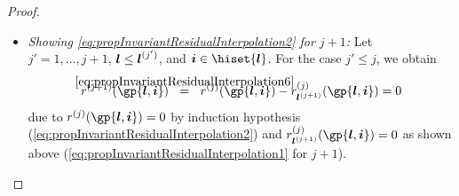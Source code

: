 \begin{proof}
\begin{itemize}
    As in the proof of \cref{lemma:combiTechniqueIdenticalValues},
    we exploit the tensor product nature of the basis functions and
    restrict $r_{\*l^{(j+1)}}^{(j)}$ to $S \cap \clint{0, 1}$:
    \begin{subequations}
      \begin{align}
        (\restrictfcn{r_{\*l^{(j+1)}}^{(j)}}{S \cap \clint{0, 1}})(x_{t'})
        &\mathrel{\righthphantom{=}{\ceq}}
        \sum_{l'_{t'}=0}^{l_{t'}^{(j+1)}}
        \sum_{i'_{t'} \in \hiset{l'_{t'}}}
        \surplustilde[(j+1)]{l'_{t'},i'_{t'}}
        \basis{l'_{t'},i'_{t'}}(x_{t'}),\quad
        x_{t'} \in \clint{0, 1},\\
        \surplustilde[(j+1)]{l'_{t'},i'_{t'}}
        &\ceq \sum_{\*l'_{-t'}=\*0}^{\*l^{(j+1)}_{-t'}}
        \sum_{\*i'_{-t'} \in \hiset{\*l'_{-t'}}}
        \surplus[(j+1)]{\*l',\*i'}
        \basis{\*l'_{-t'},\*i'_{-t'}}(\gp{\*l_{-t'},\*i_{-t'}}),
      \end{align}
    \end{subequations}
    where the subscript $-t'$ indicates all entries but the $t'$-th.
    As a consequence, this shows that
    $\restrictfcn{r_{\*l^{(j+1)}}^{(j)}}{S \cap \clint{0, 1}} \in
    \ns{l_{t'}^{(j+1)}}$ is an interpolant of the zero function
    (by \eqref{eq:proofPropInvariantResidualInterpolation2}).
    Due to the linear independence of the univariate basis functions,
    we conclude
    \begin{equation}
      \restrictfcn{r_{\*l^{(j+1)}}^{(j)}}{S \cap \clint{0, 1}}
      \equiv 0.
    \end{equation}
    Consequently, we obtain
    $r_{\*l^{(j+1)}}^{(j)}(\gp{\*l,\*i}) = 0$
    as $\gp{\*l,\*i} \in S \cap \clint{\*0, \*1}$.
    
    \item
    \emph{Showing \eqref{eq:propInvariantResidualInterpolation2} for $j + 1$:}
    Let $j' = 1, \dotsc, j + 1$, ${\boldsymbol{l}} \le {\boldsymbol{l}}^{(j')}$,
    and $\*i \in \hiset{\*l}$.
    For the case $j' \le j$, we obtain
    \begin{equation}
      \label{eq:proofPropInvariantResidualInterpolation1}
      r^{(j+1)}(\gp{\*l,\*i})
      \eqwithref{6}
      r^{(j)}(\gp{\*l,\*i}) - r_{\*l^{(j+1)}}^{(j)}(\gp{\*l,\*i})
      = 0
    \end{equation}
    due to $r^{(j)}(\gp{\*l,\*i}) = 0$ by induction hypothesis
    (\cref{eq:propInvariantResidualInterpolation2}) and
    $r_{\*l^{(j+1)}}^{(j)}(\gp{\*l,\*i}) = 0$ as shown above
    (\cref{eq:propInvariantResidualInterpolation1} for $j + 1$).
    

\end{itemize}
\end{proof}
